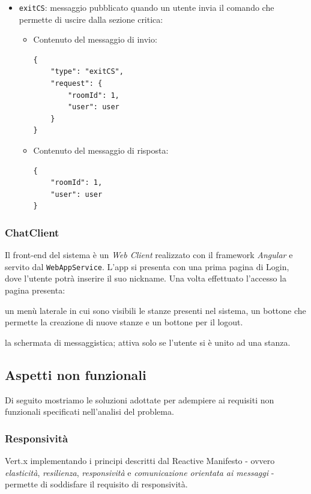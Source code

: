 \documentclass[a4paper]{article}
\begin{document}
\begin{itemize}
    \item \texttt{exitCS}: messaggio pubblicato quando un utente invia il comando che permette di uscire dalla sezione critica:
       \begin{itemize}
            \item Contenuto del messaggio di invio:
            \begin{verbatim}
{
    "type": "exitCS",
    "request": {
        "roomId": 1,
        "user": user
    }
}
            \end{verbatim}
            \item Contenuto del messaggio di risposta:
            \begin{verbatim}
{
    "roomId": 1,
    "user": user
}
            \end{verbatim}
        \end{itemize}

\end{itemize}

\subsubsection{ChatClient}
Il front-end del sistema è un \textit{Web Client} realizzato con il framework \textit{Angular} e servito dal \texttt{WebAppService}.
L'app si presenta con una prima pagina di Login, dove l'utente potrà inserire il suo nickname.
Una volta effettuato l'accesso la pagina presenta:
\begin{enumerate*}[label=(\arabic*)]
    \item un menù laterale in cui sono visibili le stanze presenti nel sistema, un bottone che permette la creazione di nuove stanze e un bottone per il logout.
    \item la schermata di messaggistica; attiva solo se l'utente si è unito ad una stanza.
\end{enumerate*}

\subsection{Aspetti non funzionali}
Di seguito mostriamo le soluzioni adottate per adempiere ai requisiti non funzionali specificati nell'analisi del problema.

\subsubsection{Responsività}
Vert.x implementando i principi descritti dal Reactive Manifesto - ovvero \textit{elasticità}, \textit{resilienza}, \textit{responsività} e \textit{comunicazione orientata ai messaggi} - permette di soddisfare il requisito di responsività.
\end{document}
